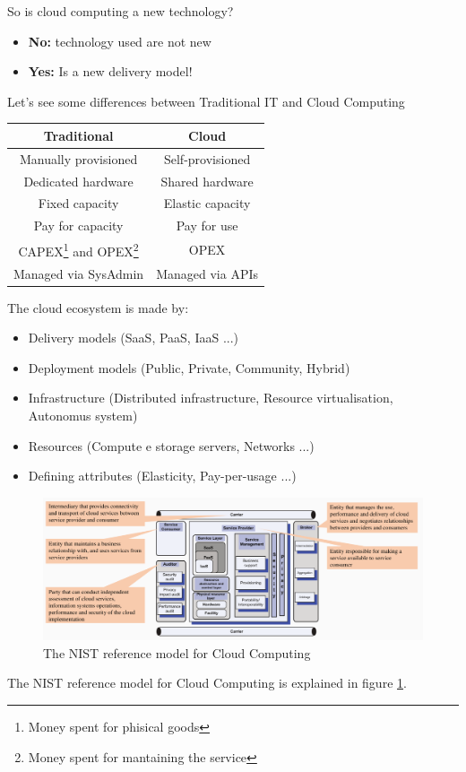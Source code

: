 So is cloud computing a new technology?
\begin{itemize}
    \item \textbf{No:} technology used are not new
    \item \textbf{Yes:} Is a new delivery model!
\end{itemize}
Let's see some differences between Traditional IT and Cloud Computing
\begin{center}
    \begin{longtable}{|c|c|}
    \hline
        Traditional & Cloud  \\
        \hline
        Manually provisioned & Self-provisioned \\ 
        Dedicated hardware & Shared hardware \\
        Fixed capacity & Elastic capacity \\
        Pay for capacity & Pay for use \\
        CAPEX\footnote{Money spent for phisical goods} and OPEX\footnote{Money spent for mantaining the service} & OPEX \\
        Managed via SysAdmin & Managed via APIs \\
        \hline
    \end{longtable}
\end{center}
The cloud ecosystem is made by:
\begin{itemize}
    \item Delivery models (SaaS, PaaS, IaaS ...)
    \item Deployment models (Public, Private, Community, Hybrid)
    \item Infrastructure (Distributed infrastructure, Resource virtualisation, Autonomus system)
    \item Resources (Compute e storage servers, Networks ...)
    \item Defining attributes (Elasticity, Pay-per-usage ...)
\end{itemize}
\begin{figure}[bh]
    \centering
    \includegraphics[scale=0.25]{images/cloudcomputingmodel.png}
    \caption{The NIST reference model for Cloud Computing}
    \label{fig:cloudmodel1}
\end{figure}
The NIST reference model for Cloud Computing is explained in figure \ref{fig:cloudmodel1}.

